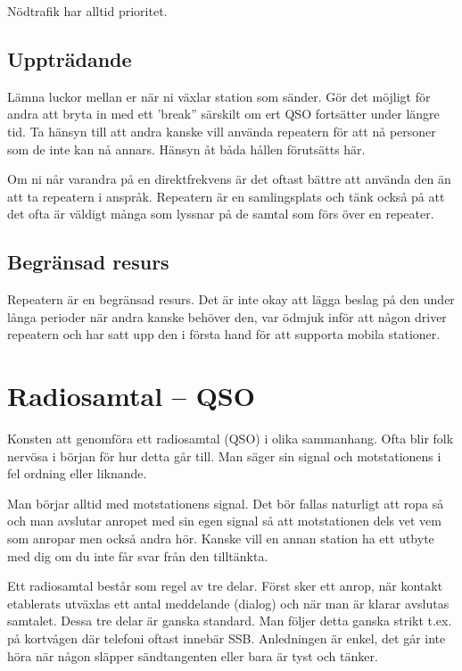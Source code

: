 Nödtrafik har alltid prioritet.

\subsection{Uppträdande}

Lämna luckor mellan er när ni växlar station som sänder. Gör det möjligt för
andra att bryta in med ett 'break'' särskilt om ert QSO fortsätter under
längre tid. Ta hänsyn till att andra kanske vill använda repeatern för att nå
personer som de inte kan nå annars. Hänsyn åt båda hållen förutsätts här.

Om ni når varandra på en direktfrekvens är det oftast bättre att använda den
än att ta repeatern i anspråk. Repeatern är en samlingsplats och tänk också på
att det ofta är väldigt många som lyssnar på de samtal som förs över en
repeater.

\subsection{Begränsad resurs}

Repeatern är en begränsad resurs. Det är inte okay att lägga beslag på den
under långa perioder när andra kanske behöver den, var ödmjuk inför att någon
driver repeatern och har satt upp den i första hand för att supporta mobila
stationer.

\section{Radiosamtal -- QSO}

Konsten att genomföra ett radiosamtal (QSO) i olika sammanhang. Ofta blir folk
nervösa i början för hur detta går till. Man säger sin signal och motstationens
i fel ordning eller liknande.

Man börjar alltid med motstationens signal. Det bör fallas naturligt att ropa så
och man avslutar anropet med sin egen signal så att motstationen dels vet vem
som anropar men också andra hör. Kanske vill en annan station ha ett utbyte med
dig om du inte får svar från den tilltänkta.

Ett radiosamtal består som regel av tre delar. Först sker ett anrop, när kontakt
etablerats utväxlas ett antal meddelande (dialog) och när man är klarar avslutas
samtalet. Dessa tre delar är ganska standard. Man följer detta ganska strikt
t.ex. på kortvågen där telefoni oftast innebär SSB. Anledningen är enkel, det
går inte höra när någon släpper sändtangenten eller bara är tyst och tänker.

